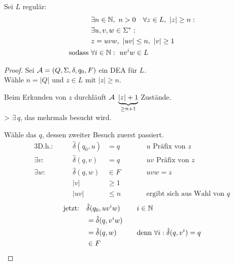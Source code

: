 \begin{lemma}\label{lem:pumping}
	Sei $L$ regulär:
	\begin{alignat*}{2}
		&\exists n\in\mathbb{N},\ n>0\quad \forall z\in L,\ |z|\geq n:\\
		&\exists u,v,w\in\Sigma^* :\\
		&z = uvw,\ |uv| \leq n,\ |v| \geq 1\\
		\text{sodass }& \forall i\in\mathbb{N}:\ uv^iw\in L
	\end{alignat*}
\end{lemma}
\vspace{-1em}
\begin{proof}
	Sei $\mathcal{A}=(Q,\Sigma,\delta,q_0,F)$ ein \ac{DEA} für $L$.\\
	Wähle $n=|Q|$ und $z\in L$ mit $|z|\geq n$.
	
	Beim Erkunden von $z$ durchläuft $\mathcal{A}\ \underbrace{|z|+1}_{\geq n+1}$ Zustände.\\
	\-> $\exists\, q$, das mehrmals besucht wird.
	
	Wähle das $q$, dessen zweiter Besuch zuerst passiert.
	\begin{alignat*}{3}
		\text{D.h.}:&\quad& \hat\delta(q_0,u)&=q &\qquad& u\text{ Präfix von }z\\
		\exists v:&& \hat\delta(q,v)&=q && uv\text{ Präfix von }z\\
		\exists w:&& \hat\delta(q,w)&\in F && uvw=z\\
		&& |v| &\geq 1\\
		&& |uv| &\leq n && \text{ergibt sich aus Wahl von }q
	\end{alignat*}
	\begin{alignat*}{2}
		\text{jetzt:}\quad &\hat\delta(q_0,uv^iw) &\quad& i\in\mathbb{N}\\
		&= \hat\delta(q,v^iw)\\
		&= \hat\delta(q,w) && \text{denn }\forall i: \hat\delta(q,v^i)=q\\
		&\in F \tag*{\qedhere}
	\end{alignat*}
\end{proof}
%
